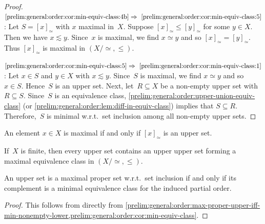 \begin{proof}
$\ref{prelim:general:order:cor:min-equiv-class:4b}\Rightarrow~\ref{prelim:general:order:cor:min-equiv-class:5}$:
 Let $S = [x]_{\simeq}$ with $x$ maximal in~$X$.
 Suppose $[x]_{\simeq} \le [y]_{\simeq}$ for some $y \in X$.
 Then we have $x \lesssim y$. Since~$x$ is maximal,
 we find $x \simeq y$ and so $[x]_{\simeq} = [y]_{\simeq}$. Thus $[x]_{\simeq}$
 is maximal in $(X / {\simeq}, \le)$.

$\ref{prelim:general:order:cor:min-equiv-class:5}\Rightarrow~\ref{prelim:general:order:cor:min-equiv-class:1}$: 
 Let $x \in S$ and $y \in X$ with $x \lesssim y$.
 Since~$S$ is maximal, we find $x \simeq y$ and so $x \in S$. Hence~$S$
 is an upper set. 
 Next, let~$R \subseteq X$ be a non-empty upper set
 with $R \subseteq S$. Since~$S$ is an equivalence class,
 \cref{prelim:general:order:upper-union-equiv-class} (or \cref{prelim:general:order:lem:diff-in-equiv-class})
 implies that $S \subseteq R$. Therefore,~$S$ is minimal w.r.t.~set inclusion
 among all non-empty upper sets.
\end{proof}

\begin{corollary}
	An element $x \in X$ is maximal if and only if $[x]_{\simeq}$ is an upper set.	
\end{corollary}

\begin{corollary}
	If~$X$ is finite, then every upper set contains
	an upper upper set forming a maximal equivalence class in $(X / {\simeq}, \le)$.
\end{corollary}

\begin{corollary}
	An upper set is a maximal proper set w.r.t.~set inclusion
	if and only if its complement is a minimal equivalence class
	for the induced partial order.
\end{corollary}
\begin{proof} This follows from directly from \cref{prelim:general:order:max-proper-upper-iff-min-nonempty-lower,prelim:general:order:cor:min-equiv-class}.
\end{proof}

